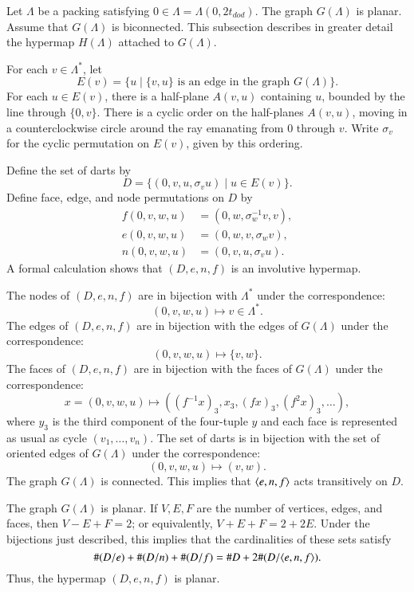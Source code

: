 Let $\Lambda$ be a packing satisfying $0\in\Lambda=\Lambda(0,2t_{dod})$.  The graph
$G(\Lambda)$ is planar.   Assume that $G(\Lambda)$ is biconnected. 
This subsection describes in greater detail the
hypermap $H(\Lambda)$ attached to $G(\Lambda)$.

For each $v\in \Lambda^*$, let 
  $$E(v) = \{u \mid \{v,u\} \text{ is an edge in the graph } G(\Lambda)\}.$$
For each $u\in E(v)$, there is a half-plane $A(v,u)$ containing $u$, bounded by
the line through $\{0,v\}$.  There is a cyclic order on the half-planes $A(v,u)$,
moving in a counterclockwise circle around the ray emanating from $0$ through $v$.
Write $\sigma_v$ for the cyclic permutation on $E(v)$, given by this ordering.

Define the set of darts by
$$
D = \{(0,v,u,\sigma_v u) \mid u\in E(v)\}.
$$
Define face, edge, and node permutations on $D$ by
$$
\begin{array}{lll}
  f(0,v,w,u) &= (0,w,\sigma_w^{-1} v,v),\\
  e(0,v,w,u) &= (0,w,v,\sigma_w v),\\
  n(0,v,w,u) &= (0,v,u,\sigma_v u).
\end{array}
$$
A formal calculation shows that $(D,e,n,f)$ is an involutive hypermap.

The nodes of $(D,e,n,f)$ are in bijection with $\Lambda^*$ under the correspondence:
$$
  (0,v,w,u) \mapsto v\in\Lambda^*.
$$
The edges of $(D,e,n,f)$ are in bijection with the edges of $G(\Lambda)$ under the
correspondence:
$$
  (0,v,w,u) \mapsto \{v,w\}.
$$
The faces of $(D,e,n,f)$ are in bijection with the faces of $G(\Lambda)$ under the
correspondence:
$$
  x = (0,v,w,u) \mapsto ((f^{-1}x)_3,x_3,(f x)_3,(f^2 x)_3,\ldots),
$$
where $y_3$ is the third component of the four-tuple $y$ and each face is represented
as usual as cycle $(v_1,\ldots,v_n)$.
The set of darts is in bijection with the set of oriented edges of $G(\Lambda)$ under
the correspondence:
$$
(0,v,w,u)\mapsto (v,w).
$$
The graph $G(\Lambda)$ is connected.  This implies that $\langle e,n,f\rangle$ acts
transitively on $D$.

The graph $G(\Lambda)$ is planar.  If $V,E,F$ are the number of vertices, edges,
and faces, then $V-E+F=2$; or equivalently, $V+E+F = 2 + 2E$.
Under the bijections just described, this implies that the cardinalities
of these sets satisfy
$$
     \#(D/e) + \#(D/n) + \#(D/f) = \# D + 2\#(D/\langle e,n,f\rangle).
$$
Thus, the hypermap $(D,e,n,f)$ is planar.

